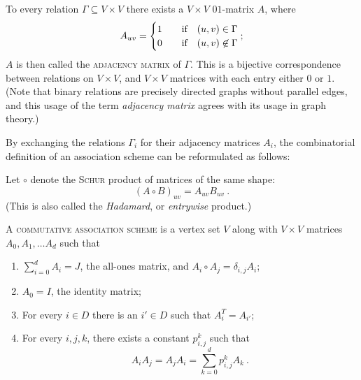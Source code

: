 \documentclass{report}
\begin{document}
    To every relation $\Gamma \subseteq V \times V$ there exists a $V \times V$
    $01$-matrix $A$, where
    \begin{equation}\label{adjacency-matrix}
      A_{uv} = \begin{cases}
        1 & \quad\text{if}\quad (u, v) \in \Gamma \\
        0 & \quad\text{if}\quad (u, v) \not\in \Gamma \\
      \end{cases};
    \end{equation}
    $A$ is then called the \textsc{adjacency matrix} of $\Gamma$.
    This is a bijective correspondence between relations on $V \times V$,
    and $V \times V$ matrices with each entry either $0$ or $1$.
    (Note that binary relations are precisely directed graphs without parallel
    edges, and this usage of the term \textit{adjacency matrix} agrees with its
    usage in graph theory.)

    By exchanging the relations $\Gamma_i$ for their adjacency matrices $A_i$, the
    combinatorial definition of an association scheme can be reformulated as
    follows:

    \begin{defn}
      \label{association-scheme-alg}
      Let $\circ$ denote the \textsc{Schur} product of matrices of the same shape:
      \begin{equation}\label{schur-prod}
        (A \circ B)_{uv} = A_{uv} B_{uv}
        \ .
      \end{equation}
      (This is also called the \textit{Hadamard}, or \textit{entrywise} product.)

      A \textsc{commutative association scheme} is a vertex set $V$ along with
      $V \times V$ matrices $A_0, A_1, \ldots A_d$ such that
      \begin{enumerate}
        \item $\displaystyle \sum_{i=0}^d A_i = J$, the all-ones matrix,
          and $A_i \circ A_j = \delta_{i, j} A_i$;
          \label{aAS-part}
        \item $A_0 = I$, the identity matrix;
          \label{aAS-diag}
        \item For every $i \in D$ there is an $i' \in D$ such that $A_i^T =
          A_{i'}$;
          \label{aAS-sym}
        \item For every $i, j, k$, there exists a constant $p_{i, j}^k$ such
          that
          $$
            A_i A_j = A_j A_i = \sum_{k = 0}^d p_{i, j}^k A_k
            \ .
          $$
          \label{aAS-reg}
      \end{enumerate}
    \end{defn}
\end{document}
